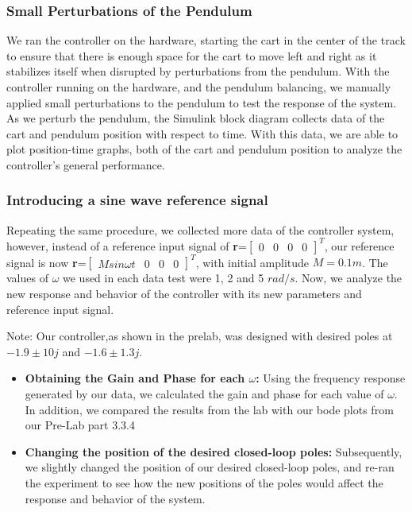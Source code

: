 \documentclass[11pt, twoside, letterpaper]{article}   	%
\begin{document}
\subsubsection{Small Perturbations of the Pendulum}
We ran the controller on the hardware, starting the cart in the center of the track to ensure that there is enough space for the cart to move left and right as it stabilizes itself when disrupted by perturbations from the pendulum.  With the controller running on the hardware, and the pendulum balancing, we manually applied small perturbations to the pendulum to test the response of the system.  As we perturb the pendulum, the Simulink block diagram collects data of the cart and pendulum position with respect to time.  With this data, we are able to plot position-time graphs, both of the cart and pendulum position to analyze the controller's general performance.

\subsubsection{Introducing a sine wave reference signal}
Repeating the same procedure, we collected more data of the controller system, however, instead of a reference input signal of \textbf{r}=$ \begin{bmatrix} 0 & 0 & 0 &0 \end{bmatrix}^T$, our reference signal is now \textbf{r}=$ \begin{bmatrix} Msin\omega t & 0 & 0 &0 \end{bmatrix}^T$, with initial amplitude $M=0.1m$.  The values of $\omega$ we used in each data test were 1, 2 and 5 $rad/s$.  Now, we analyze the new response and behavior of the controller with its new parameters and reference input signal.

Note: Our controller,as shown in the prelab, was designed with desired poles at $-1.9\pm10j$ and $-1.6\pm1.3j$.

\begin{itemize}
\item \textbf{Obtaining the Gain and Phase for each $\omega$:}
Using the frequency response generated by our data, we calculated the gain and phase for each value of $\omega$.  In addition, we compared the results from the lab with our bode plots from our Pre-Lab part 3.3.4

\item \textbf{Changing the position of the desired closed-loop poles:}
Subsequently, we slightly changed the position of our desired closed-loop poles, and re-ran the experiment to see how the new positions of the poles would affect the response and behavior of the system.
\end{itemize}
\end{document}
